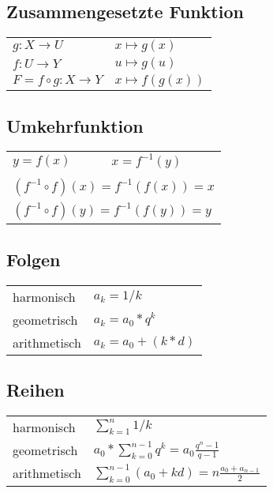 \subsection{Zusammengesetzte Funktion}
\begin{tabular}{ll}
    $ g : X \rightarrow U $ & $ x \mapsto g(x) $ \\
    $ f : U \rightarrow Y $ & $ u \mapsto g(u) $ \\
    $ F = f \circ g : X \rightarrow Y $ & $ x \mapsto f(g(x)) $ \\
\end{tabular} 

\subsection{Umkehrfunktion}
\begin{tabular}{ll}
    $ y = f(x) $ & $ x = f^{-1}(y) $ \\
    & \\
    \multicolumn{2}{l}{$ (f^{-1} \circ f)(x) = f^{-1}(f(x)) = x $} \\
    \multicolumn{2}{l}{$ (f^{-1} \circ f)(y) = f^{-1}(f(y)) = y $} \\
\end{tabular} 

\subsection{Folgen}
\begin{tabular}{ll}
    harmonisch & $ a_k = 1 / k $ \\
    geometrisch & $ a_k = a_0 * q^k $ \\
    arithmetisch & $ a_k = a_0 + (k*d) $ \\
\end{tabular} 

\subsection{Reihen}
\begin{tabular}{ll}
    harmonisch & $ \sum_{k=1}^n 1 / k $ \\
    geometrisch & $ a_0 * \sum_{k=0}^{n-1} q^k = a_0 \frac{q^n - 1}{q - 1}$ \\
    arithmetisch & $ \sum_{k=0}^{n-1} (a_0 + kd) = n \frac{a_0 + a_{n-1}}{2}$ \\
\end{tabular} 

